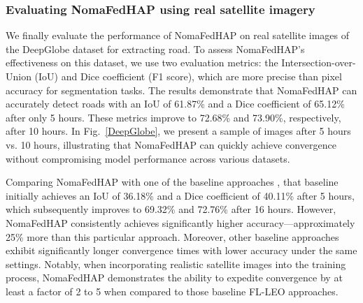 \documentclass[letter,journal]{IEEEtran}
\begin{document}
\subsubsection{\bf Evaluating NomaFedHAP using real satellite imagery} We finally evaluate the performance of NomaFedHAP on real satellite images of the DeepGlobe dataset for extracting road. To assess NomaFedHAP's effectiveness on this dataset, we use two evaluation metrics: the Intersection-over-Union (IoU) and Dice coefficient (F1 score), which are more precise than pixel accuracy for segmentation tasks. The results demonstrate that NomaFedHAP can accurately detect roads with an IoU of 61.87\% and a Dice coefficient of 65.12\% after only 5 hours. These metrics improve to 72.68\% and 73.90\%, respectively, after 10 hours. In Fig.~\ref{DeepGlobe}, we present a sample of images after 5 hours vs. 10 hours, illustrating that NomaFedHAP can quickly achieve convergence without compromising model performance across various datasets.

Comparing NomaFedHAP with one of the baseline approaches \cite{e2023opt}, that baseline initially achieves an IoU of 36.18\% and a Dice coefficient of 40.11\% after 5 hours, which subsequently improves to 69.32\% and 72.76\% after 16 hours. However, NomaFedHAP consistently achieves significantly higher accuracy—approximately 25\% more than this particular approach. Moreover, other baseline approaches exhibit significantly longer convergence times with lower accuracy under the same settings. Notably, when incorporating realistic satellite images into the training process, NomaFedHAP demonstrates the ability to expedite convergence by at least a factor of 2 to 5 when compared to those baseline FL-LEO approaches.
    
\end{document}
